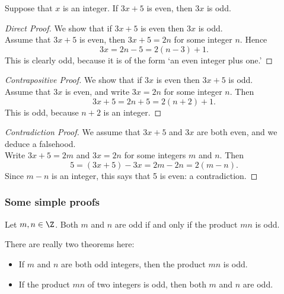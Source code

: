 \begin{thm}\label{thm:3xodd}
Suppose that $x$ is an integer. If $3x+5$ is even, then $3x$ is odd.
\end{thm}

\begin{proof}[Direct Proof]
We show that if $3x+5$ is even then $3x$ is odd.\\[5pt]
Assume that $3x+5$ is even, then $3x+5=2n$ for some integer $n$. Hence
\[3x=2n-5=2(n-3)+1.\]
This is clearly odd, because it is of the form `an even integer plus one.'
\end{proof}

\begin{proof}[Contrapositive Proof]
We show that if $3x$ is even then $3x+5$ is odd.\\[5pt]
Assume that $3x$ is even, and write $3x=2n$ for some integer $n$. Then
\[3x+5=2n+5=2(n+2)+1.\]
This is odd, because $n+2$ is an integer.
\end{proof}

\begin{proof}[Contradiction Proof]
We assume that $3x+5$ and $3x$ are both even, and we deduce a falsehood.\\[5pt]
Write $3x+5=2m$ and $3x=2n$ for some integers $m$ and $n$. Then
\[5=(3x+5)-3x=2m-2n=2(m-n).\]
Since $m-n$ is an integer, this says that 5 is even: a contradiction.
\end{proof}


\subsubsection*{Some simple proofs}


\begin{thm}\label{thm:oddprod}
Let $m,n\in\Z$. Both $m$ and $n$ are odd if and only if the product $mn$ is odd.
\end{thm}

\noindent There are really two theorems here:
\begin{itemize}
\item[]\itemstart{($\Rightarrow$)} If $m$ and $n$ are both odd integers, then the product $mn$ is odd.
\item[]\itemstart{($\Leftarrow$)} If the product $mn$ of two integers is odd, then both $m$ and $n$ are odd.
 \end{itemize}
 
